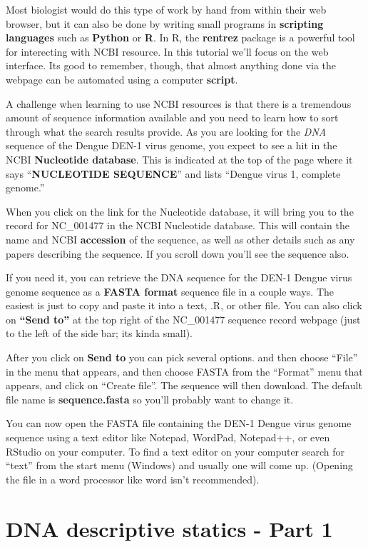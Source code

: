 \documentclass[
]{book}
\begin{document}
Most biologist would do this type of work by hand from within their web browser, but it can also be done by writing small programs in \textbf{scripting languages} such as \textbf{Python} or \textbf{R}. In R, the \textbf{rentrez} package is a powerful tool for interecting with NCBI resource. In this tutorial we'll focus on the web interface. Its good to remember, though, that almost anything done via the webpage can be automated using a computer \textbf{script}.

A challenge when learning to use NCBI resources is that there is a tremendous amount of sequence information available and you need to learn how to sort through what the search results provide. As you are looking for the \emph{DNA} sequence of the Dengue DEN-1 virus genome, you expect to see a hit in the NCBI \textbf{Nucleotide database}. This is indicated at the top of the page where it says ``\textbf{NUCLEOTIDE SEQUENCE}'' and lists ``Dengue virus 1, complete genome.''

When you click on the link for the Nucleotide database, it will bring you to the record for NC\_001477 in the NCBI Nucleotide database. This will contain the name and NCBI \textbf{accession} of the sequence, as well as other details such as any papers describing the sequence. If you scroll down you'll see the sequence also.

If you need it, you can retrieve the DNA sequence for the DEN-1 Dengue virus genome sequence as a \textbf{FASTA format} sequence file in a couple ways. The easiest is just to copy and paste it into a text, .R, or other file. You can also click on \textbf{``Send to''} at the top right of the NC\_001477 sequence record webpage (just to the left of the side bar; its kinda small).

After you click on \textbf{Send to} you can pick several options. and then choose ``File'' in the menu that appears, and then choose FASTA from the ``Format'' menu that appears, and click on ``Create file''. The sequence will then download. The default file name is \textbf{sequence.fasta} so you'll probably want to change it.

You can now open the FASTA file containing the DEN-1 Dengue virus genome sequence using a text editor like Notepad, WordPad, Notepad++, or even RStudio on your computer. To find a text editor on your computer search for ``text'' from the start menu (Windows) and usually one will come up. (Opening the file in a word processor like word isn't recommended).

\hypertarget{dna-descriptive-statics---part-1}{%
\chapter{DNA descriptive statics - Part 1}\label{dna-descriptive-statics---part-1}}
\end{document}
